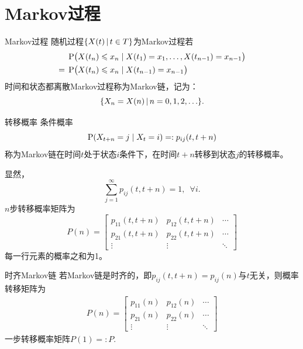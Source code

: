\section{Markov过程}
\begin{definition}{Markov过程}{}
	随机过程$\set{X(t)}{t \in T}$为Markov过程若%
	\begin{equation}\label{eq:ps-markov-property}
	    \begin{aligned}
			&\P\bigp{X(t_n) \leqslant x_n \mid X(t_1) = x_1,\ldots,X(t_{n-1}) = x_{n-1}}\\
			= {}&\P\bigp{X(t_n) \leqslant x_n \mid X(t_{n-1}) = x_{n-1}}
	    \end{aligned}
	\end{equation}
	时间和状态都离散Markov过程称为Markov链，记为：
	\[
		\set{X_n = X(n)}{n = 0,1,2,\ldots}.
	\]
\end{definition}
\begin{definition}{转移概率}{}
	条件概率 
	\begin{equation}\label{eq:ps-transition-probability}
		\P(X_{t+n} = j \mid X_t = i) =: p_{ij}(t,t + n)
	\end{equation}
	称为Markov链在时间$t$处于状态$i$条件下，在时间$t + n$转移到状态$j$的转移概率。
\end{definition}
显然，
\begin{equation}\label{eq:ps-stochastic-row-sum}
	\sum_{j=1}^\infty p_{ij}(t,t + n) = 1,\enspace\forall i.
\end{equation}
$n$步转移概率矩阵为
\begin{equation}
	P(n) = \begin{bmatrix}
		p_{11}(t,t + n)&p_{12}(t,t + n)&\cdots\\
		p_{21}(t,t + n)&p_{22}(t,t + n)&\cdots\\
		\vdots&\vdots&\ddots
	\end{bmatrix}
\end{equation}
每一行元素的概率之和为1。
\begin{definition}{时齐Markov链}{}
	若Markov链是时齐的，即$p_{ij}(t,t + n) = p_{ij}(n)$与$t$无关，则概率转移矩阵为
	\begin{align*}
		P(n) = \begin{bmatrix}
			p_{11}(n)&p_{12}(n)&\cdots\\
			p_{21}(n)&p_{22}(n)&\cdots\\
			\vdots&\vdots&\ddots
		\end{bmatrix}
	\end{align*}
	一步转移概率矩阵$P(1) =: P.$
\end{definition}
